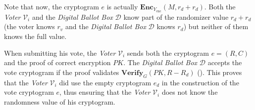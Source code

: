 


Note that now, the cryptogram $e$ is actually \( \mathbf{Enc}_{Y_\mathrm{enc}} (M, r_d + r_d) \). Both the \textit{Voter} $\mathcal{V}_i$ and the \textit{Digital Ballot Box} $\mathcal{D}$ know part of the randomizer value \( r_d + r_d \) (the voter knows $r_v$ and the \textit{Digital Ballot Box} $\mathcal{D}$ knows $r_d$) but neither of them knows the full value.

When submitting his vote, the \textit{Voter} $\mathcal{V}_i$ sends both the cryptogram \( e = (R, C) \) and the proof of correct encryption $PK$. The \textit{Digital Ballot Box} $\mathcal{D}$ accepts the vote cryptogram if the proof validates \( \mathbf{Verify}_G (PK, R - R_d) \) (). This proves that the \textit{Voter} $\mathcal{V}_i$ did use the empty cryptogram $e_d$ in the construction of the vote cryptogram $e$, thus ensuring that the \textit{Voter} $\mathcal{V}_i$ does not know the randomness value of his cryptogram.

